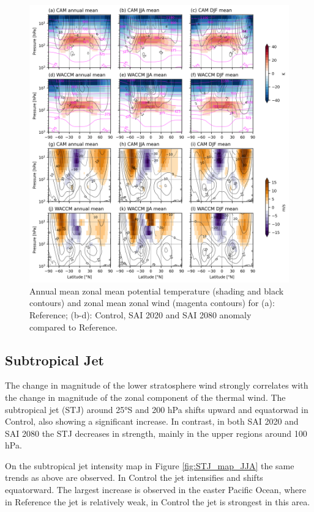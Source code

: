 \begin{figure}[H]
	\centering
	\includegraphics[width=0.95\linewidth]{images/th_U_full.png}
	\caption{Annual mean zonal mean potential temperature (shading and black contours) and zonal mean zonal wind (magenta contours) for (a): Reference; (b-d): Control, SAI 2020 and SAI 2080 anomaly compared to Reference.}
	\label{fig:th_U_zmdiff_full}
\end{figure}


\subsection{Subtropical Jet}
The change in magnitude of the lower stratosphere wind strongly correlates with the change in magnitude of the zonal component of the thermal wind. The subtropical jet (STJ) around 25°S and 200 hPa shifts upward and equatorwad in Control, also showing a significant increase. In contrast, in both SAI 2020 and SAI 2080 the STJ decreases in strength, mainly in the upper regions around 100 hPa.  

On the subtropical jet intensity map in Figure \ref{fig:STJ_map_JJA} the same trends as above are observed. In Control the jet intensifies and shifts equatorward. The largest increase is observed in the easter Pacific Ocean, where in Reference the jet is relatively weak, in Control the jet is strongest in this area.

